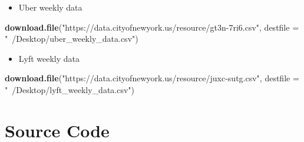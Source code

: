 \documentclass[12pt,twoside]{reedthesis}
\newenvironment{Shaded}{\begin{snugshade}}{\end{snugshade}}
\newcommand{\KeywordTok}[1]{\textcolor[rgb]{0.13,0.29,0.53}{\textbf{#1}}}
\newcommand{\DataTypeTok}[1]{\textcolor[rgb]{0.13,0.29,0.53}{#1}}
\newcommand{\StringTok}[1]{\textcolor[rgb]{0.31,0.60,0.02}{#1}}
\newcommand{\NormalTok}[1]{#1}
\providecommand{\tightlist}{%
  \setlength{\itemsep}{0pt}\setlength{\parskip}{0pt}}
\theoremstyle{definition}
\theoremstyle{definition}
\theoremstyle{definition}
\theoremstyle{remark}
\begin{document}
\begin{itemize}
\tightlist
\item
  Uber weekly data
\end{itemize}
\begin{Shaded}
\begin{Highlighting}[]
\KeywordTok{download.file}\NormalTok{(}\StringTok{"https://data.cityofnewyork.us/resource/gt3n-7ri6.csv"}\NormalTok{, }\DataTypeTok{destfile =} \StringTok{"~/Desktop/uber_weekly_data.csv"}\NormalTok{)}
\end{Highlighting}
\end{Shaded}
\begin{itemize}
\tightlist
\item
  Lyft weekly data
\end{itemize}
\begin{Shaded}
\begin{Highlighting}[]
\KeywordTok{download.file}\NormalTok{(}\StringTok{"https://data.cityofnewyork.us/resource/juxc-sutg.csv"}\NormalTok{, }\DataTypeTok{destfile =} \StringTok{"~/Desktop/lyft_weekly_data.csv"}\NormalTok{)}
\end{Highlighting}
\end{Shaded}
\section{Source Code}\label{source-code}
\end{document}
